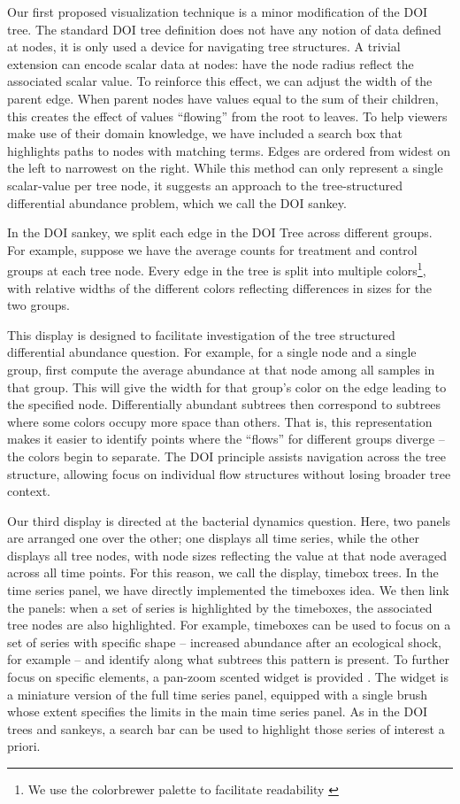 Our first proposed visualization technique is a minor modification of the DOI
tree. The standard DOI tree definition does not have any notion of data defined
at nodes, it is only used a device for navigating tree structures. A trivial
extension can encode scalar data at nodes: have the node radius reflect the
associated scalar value. To reinforce this effect, we can adjust the width of
the parent edge. When parent nodes have values equal to the sum of their
children, this creates the effect of values ``flowing'' from the root to leaves.
To help viewers make use of their domain knowledge, we have included a search
box that highlights paths to nodes with matching terms. Edges are ordered from
widest on the left to narrowest on the right. While this method can only
represent a single scalar-value per tree node, it suggests an approach to the
tree-structured differential abundance problem, which we call the DOI sankey.

In the DOI sankey, we split each edge in the DOI Tree across different groups.
For example, suppose we have the average counts for treatment and control groups
at each tree node. Every edge in the tree is split into multiple colors\footnote{We
  use the colorbrewer palette to facilitate readability
  \citep{brewer2003colorbrewer}}, with relative widths of the different colors
reflecting differences in sizes for the two groups.

This display is designed to facilitate investigation of the tree structured
differential abundance question. For example, for a single node and a single
group, first compute the average abundance at that node among all samples in
that group. This will give the width for that group's color on the edge leading
to the specified node. Differentially abundant subtrees then correspond to
subtrees where some colors occupy more space than others. That is, this
representation makes it easier to identify points where the ``flows'' for
different groups diverge -- the colors begin to separate. The DOI principle
assists navigation across the tree structure, allowing focus on individual flow
structures without losing broader tree context.

Our third display is directed at the bacterial dynamics question. Here, two
panels are arranged one over the other; one displays all time series, while the
other displays all tree nodes, with node sizes reflecting the value at that node
averaged across all time points. For this reason, we call the display, timebox
trees. In the time series panel, we have directly implemented the timeboxes
idea. We then link the panels: when a set of series is highlighted by the
timeboxes, the associated tree nodes are also highlighted. For example,
timeboxes can be used to focus on a set of series with specific shape --
increased abundance after an ecological shock, for example -- and identify along
what subtrees this pattern is present. To further focus on specific elements, a
pan-zoom scented widget is provided \citep{willett2007scented}. The widget is a
miniature version of the full time series panel, equipped with a single brush
whose extent specifies the limits in the main time series panel. As in the DOI
trees and sankeys, a search bar can be used to highlight those series of
interest a priori.

